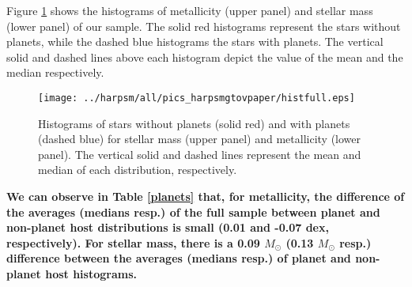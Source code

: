 \documentclass[structabstract]{aa}
\begin{document}

Figure \ref{histfull} shows the histograms of metallicity (upper panel) and stellar mass (lower panel) of our sample. The solid red histograms represent the stars without planets, while the dashed blue histograms the stars with planets. The vertical solid and dashed lines above each histogram depict the value of the mean and the median respectively. 



\begin{figure}[h]
\begin{center}
\texttt{[image: ../harpsm/all/pics\_harpsmgtovpaper/histfull.eps]}
\end{center}
\caption{Histograms of stars without planets (solid red) and with planets (dashed blue) for stellar mass (upper panel) and metallicity (lower panel). The vertical solid and dashed lines represent the mean and median of each distribution, respectively.}
\label{histfull}
\end{figure}


\textbf{We can observe in Table \ref{planets} that, for metallicity, the difference of the averages (medians resp.) of the full sample between planet and non-planet host distributions is small (0.01 and -0.07 dex, respectively). For stellar mass, there is a 0.09 $M_{\odot}$ (0.13 $M_{\odot}$ resp.) difference between the averages (medians resp.) of planet and non-planet host histograms.} 

\begin{table}[h]
\centering
\caption{Difference of averages and medians between planet host and non-planet host distributions.}
\label{planets}
\begin{center}
\end{center}
\end{table}
\end{document}

